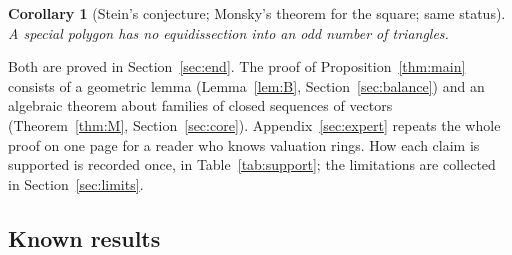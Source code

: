 \documentclass[11pt]{article}
\newtheorem{corollary}[theorem]{Corollary}
\theoremstyle{definition}
\begin{document}
\begin{corollary}[Stein's conjecture; Monsky's theorem for the square; same status]\label{cor:stein}
A special polygon has no equidissection into an odd number of triangles.
\end{corollary}

Both are proved in Section~\ref{sec:end}. The proof of Proposition~\ref{thm:main} consists of a
geometric lemma (Lemma~\ref{lem:B}, Section~\ref{sec:balance}) and an algebraic theorem about
families of closed sequences of vectors (Theorem~\ref{thm:M}, Section~\ref{sec:core}).
Appendix~\ref{sec:expert} repeats the whole proof on one page for a reader who knows valuation
rings. How each claim is supported is recorded once, in Table~\ref{tab:support}; the limitations
are collected in Section~\ref{sec:limits}.

\subsection{Known results}\label{sec:known}
\end{document}
